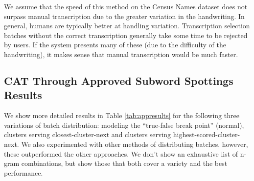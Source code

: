 \documentclass[ms,electronic,twosidetoc,letterpaper,chaptercenter,parttop,lof,lot]{byumsphd}
\begin{document}
We assume that the speed of this method on the Census Names dataset does not surpass manual transcription due to the greater variation in the handwriting. In general, humans are typically better at handling variation. Transcription selection batches without the correct transcription generally take some time to be rejected by users. If the system presents many of these (due to the difficulty of the handwriting), it makes sense that manual transcription would be much faster.

\subsection{CAT Through Approved Subword Spottings Results}

We show more detailed results in Table \ref{tab:appresults} for the following three variations of batch distribution: modeling the ``true-false break point'' (normal), clusters serving closest-cluster-next and clusters serving highest-scored-cluster-next. We also experimented with other methods of distributing batches, however, these outperformed the other approaches. We don't show an exhaustive list of n-gram combinations, but show those that both cover a variety and the best performance.
\end{document}
